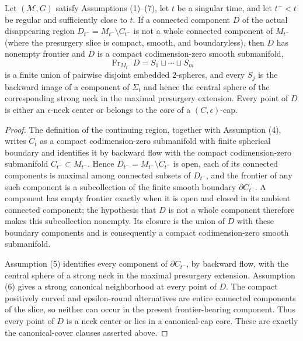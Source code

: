 \begin{lemma}
\label{lem:actual-disappearing-component-frontier-saturation}
\notready
Let $({\mathcal M},G)$ satisfy Assumptions (1)--(7), let $t$ be a singular
time, and let $t^-<t$ be regular and sufficiently close to $t$.  If a connected
component $D$ of the actual disappearing region
$D_{t^-}=M_{t^-}\setminus C_{t^-}$ is not a whole connected component of
$M_{t^-}$ (where the presurgery slice is compact, smooth, and boundaryless),
then $D$ has nonempty frontier and $\overline D$ is a
compact codimension-zero smooth submanifold,
\[
 \operatorname{Fr}_{M_{t^-}}D=S_1\sqcup\cdots\sqcup S_m
\]
is a finite union of pairwise disjoint embedded $2$-spheres, and every
$S_j$ is the backward image of a component of $\Sigma_t$ and hence the central
sphere of the corresponding strong neck in the maximal presurgery extension.
Every point of $D$ is either an $\epsilon$-neck center or belongs to the core
of a $(C,\epsilon)$-cap.
\end{lemma}

\begin{proof}
The definition of the continuing region, together with Assumption (4),
writes $C_t$ as a compact codimension-zero submanifold with finite spherical
boundary and identifies it by backward flow with the compact
codimension-zero submanifold $C_{t^-}\subset M_{t^-}$.  Hence
$D_{t^-}=M_{t^-}\setminus C_{t^-}$ is open, each of its connected components
is maximal among connected subsets of $D_{t^-}$, and the frontier of any such
component is a subcollection of the finite smooth boundary
$\partial C_{t^-}$.  A component has empty frontier exactly when it is open
and closed in its ambient connected component; the hypothesis that $D$ is not
a whole component therefore makes this subcollection nonempty.  Its closure
is the union of $D$ with these boundary components and is consequently a
compact codimension-zero smooth submanifold.

Assumption (5) identifies every component of $\partial C_{t^-}$, by backward
flow, with the central sphere of a strong neck in the maximal presurgery
extension.  Assumption (6) gives a strong canonical neighborhood at every
point of $D$.  The compact positively curved and epsilon-round alternatives
are entire connected components of the slice, so neither can occur in the
present frontier-bearing component.  Thus every point of $D$ is a neck center
or lies in a canonical-cap core.  These are exactly the canonical-cover
clauses asserted above.
\end{proof}

